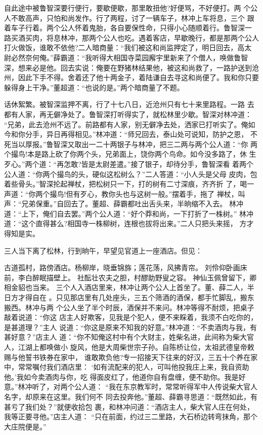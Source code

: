 自此途中被鲁智深要行便行，要歇便歇，那里敢扭他?好便骂，不好便打。两
个公人不敢高声，只怕和尚发作。行了两程，讨了一辆车子，林冲上车将息，三个
跟着车子行着。两个公人怀着鬼胎，各自要保性命，只得小心随顺着行。鲁智深一
路买酒买肉，将息林冲，那两个公人也吃。遇着客店，早歇晚行，都是那两个公人
打火做饭，谁敢不依他?二人暗商量：“我们被这和尚监押定了，明日回去，高太
尉必然奈何俺。”薛霸道：“我听得大相国寺菜园廨宇里新来了个僧人，唤做鲁智
深，想来必是他。回去实说：俺要在野猪林结果他，被这和尚救了，一路护送到沧
州，因此下手不得。舍着还了他十两金子，着陆谦自去寻这和尚便了。我和你只要
躲得身上干净。”董超道：“也说的是。”两个暗商量了不题。

话休絮繁。被智深监押不离，行了十七八日，近沧州只有七十来里路程。一路
去都有人家，再无僻净处了。鲁智深打听得实了，就松林里少歇。智深对林冲道：
“兄弟，此去沧州不远了。前路都有人家，别无僻净去处，洒家已打听实了。俺如
今和你分手，异日再得相见。”林冲道：“师兄回去，泰山处可说知，防护之恩，
不死当以厚报。”鲁智深又取出一二十两银子与林冲，把三二两与两个公人道：“你
两个撮鸟!本是路上砍了你两个头，兄弟面上，饶你两个鸟命。如今没多路了，休
生歹心。”两个道：“再怎敢?皆是太尉差遣。”接了银子，却待分手，鲁智深看
着两个公人道：“你两个撮鸟的头，硬似这松树么？”二人答道：“小人头是父母
皮肉，包着些骨头。”智深抡起禅杖，把松树只一下，打的树有二寸深痕，齐齐折
了，喝一声道：“你两个撮鸟!但有歹心，教你头也与这树一般。”摆着手，拖了
禅杖，叫声：“兄弟保重。”自回去了。董超、薛霸都吐出舌头来，半晌缩不入去。
林冲道：“上下，俺们自去罢。”两个公人道：“好个莽和尚，一下打折了一株树。”
林冲道：“这个直得甚么?相国寺一株柳树，连根也拔将出来。”二人只把头来摇，
方才得知是实。

三人当下离了松林，行到晌午，早望见官道上一座酒店。但见：

古道孤村，路傍酒店。杨柳岸，晓垂锦旆；莲花荡，风拂青帘。
刘伶仰卧画床前，李白醉眠描壁上。
社酝壮农夫之胆，村醪助野叟之容。
神仙玉佩曾留下，卿相金貂也当来。
三个人入酒店里来，林冲让两个公人上首坐了。董、薛二人，半日方才得自在
。只见那店里有几处座头，三五个筛酒的酒保，都手忙脚乱，搬东搬西。林冲与两
个公人坐了半个时辰，酒保并不来问。林冲等得不耐烦，把桌子敲着说道：“你这
店主人好欺客，见我是个犯人，便不来睬着，我须不白吃你的，是甚道理？”主人
说道：“你这是原来不知我的好意。”林冲道：“不卖酒肉与我，有甚好意？”店主人
道：“你不知俺这村中有个大财主，姓柴名进，此间称为柴大官人，江湖上都唤做小
旋风，他是大周柴世宗子孙。自陈桥让位，太祖武德皇帝敕赐与他誓书铁券在家中，
谁敢欺负他?专一招接天下往来的好汉，三五十个养在家中，常常嘱付我们酒店里：
‘如有流配来的犯人，可叫他投我庄上来，我自资助他。’我如今卖酒肉与你，吃
得面皮红了，他道你自有盘缠，便不助你。我是好意。”林冲听了，对两个公人道：
“我在东京教军时，常常听得军中人传说柴大官人名字，却原来在这里。我们何不
同去投奔他。”董超、薛霸寻思道：“既然如此，有甚亏了我们处？”就便收拾包
裹，和林冲问道：“酒店主人，柴大官人庄在何处，我等正要寻他。”店主人道：
“只在前面，约过三二里路，大石桥边转弯抹角，那个大庄院便是。”

